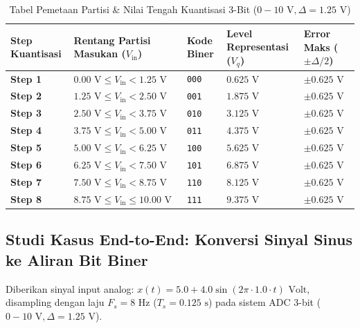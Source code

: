 \documentclass[11pt,a4paper]{article}
\begin{document}
\begin{table}[h!]
\centering
\small
\caption{Tabel Pemetaan Partisi \& Nilai Tengah Kuantisasi 3-Bit ($0 - 10\text{ V}, \Delta = 1.25\text{ V}$)}
\begin{tabularx}{\textwidth}{>{\centering\arraybackslash}m{2.0cm} >{\centering\arraybackslash}X >{\centering\arraybackslash}m{2.0cm} >{\centering\arraybackslash}m{3.2cm} >{\centering\arraybackslash}m{2.5cm}}
\toprule
\textbf{Step Kuantisasi} & \textbf{Rentang Partisi Masukan ($V_{\text{in}}$)} & \textbf{Kode Biner} & \textbf{Level Representasi ($V_q$)} & \textbf{Error Maks ($\pm \Delta/2$)} \\
\midrule
\textbf{Step 1} & $0.00\text{ V} \leq V_{\text{in}} < 1.25\text{ V}$ & \texttt{000} & $0.625\text{ V}$ & $\pm 0.625\text{ V}$ \\
\textbf{Step 2} & $1.25\text{ V} \leq V_{\text{in}} < 2.50\text{ V}$ & \texttt{001} & $1.875\text{ V}$ & $\pm 0.625\text{ V}$ \\
\textbf{Step 3} & $2.50\text{ V} \leq V_{\text{in}} < 3.75\text{ V}$ & \texttt{010} & $3.125\text{ V}$ & $\pm 0.625\text{ V}$ \\
\textbf{Step 4} & $3.75\text{ V} \leq V_{\text{in}} < 5.00\text{ V}$ & \texttt{011} & $4.375\text{ V}$ & $\pm 0.625\text{ V}$ \\
\textbf{Step 5} & $5.00\text{ V} \leq V_{\text{in}} < 6.25\text{ V}$ & \texttt{100} & $5.625\text{ V}$ & $\pm 0.625\text{ V}$ \\
\textbf{Step 6} & $6.25\text{ V} \leq V_{\text{in}} < 7.50\text{ V}$ & \texttt{101} & $6.875\text{ V}$ & $\pm 0.625\text{ V}$ \\
\textbf{Step 7} & $7.50\text{ V} \leq V_{\text{in}} < 8.75\text{ V}$ & \texttt{110} & $8.125\text{ V}$ & $\pm 0.625\text{ V}$ \\
\textbf{Step 8} & $8.75\text{ V} \leq V_{\text{in}} \leq 10.00\text{ V}$ & \texttt{111} & $9.375\text{ V}$ & $\pm 0.625\text{ V}$ \\
\bottomrule
\end{tabularx}
\end{table}

\newpage
\subsection{Studi Kasus End-to-End: Konversi Sinyal Sinus ke Aliran Bit Biner}

Diberikan sinyal input analog: $x(t) = 5.0 + 4.0 \sin(2\pi \cdot 1.0 \cdot t)\text{ Volt}$, disampling dengan laju $F_s = 8\text{ Hz}$ ($T_s = 0.125\text{ s}$) pada sistem ADC 3-bit ($0 - 10\text{ V}, \Delta = 1.25\text{ V}$).
\end{document}
